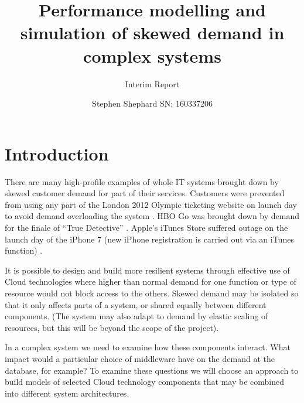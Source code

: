 \documentclass{llncs}
\begin{document}
	
\title{Performance modelling and simulation of skewed demand in complex systems}
\subtitle{Interim Report}

\author{Stephen Shephard SN: 160337206}



\maketitle

%
%

\section{Introduction}

There are many high-profile examples of whole IT systems brought down by skewed customer demand for part of their services.  Customers were prevented from using any part of the London 2012 Olympic ticketing website on launch day to avoid demand overloading the system \cite{RN1067}.  HBO Go was brought down by demand for the finale of ``True Detective'' \cite{RN1066}.  Apple's iTunes Store suffered outage on the launch day of the iPhone 7 (new iPhone registration is carried out via an iTunes function) \cite{RN1068}.

It is possible to design and build more resilient systems through effective use of Cloud technologies where higher than normal demand for one function or type of resource would not block access to the others.  Skewed demand may be isolated so that it only affects parts of a system, or shared equally between different components. (The system may also adapt to demand by elastic scaling of resources, but this will be beyond the scope of the project).

In a complex system we need to examine how these components interact.  What impact would a particular choice of middleware have on the demand at the database, for example?  To examine these questions we will choose an approach to build models of selected Cloud technology components that may be combined into different system architectures.

%
%
\end{document}
